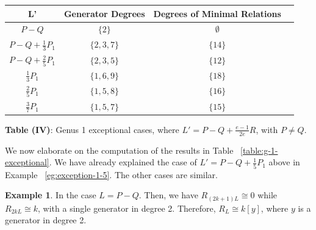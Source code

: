 \documentclass{amsart}
\theoremstyle{plain}
\theoremstyle{definition}
\newtheorem{example}[thm]{Example}
\theoremstyle{remark}
\newtheorem{rem}[thm]{Remark}
\numberwithin{equation}{section}
\begin{document}
\begin{longtable}	{| c || c | c | c |}
	\hline
	L' & Generator Degrees & Degrees of Minimal Relations \\
	\hline
	\hline
	$P - Q$ & $\{2\}$ & $\emptyset$ \\	\hline

	$P - Q + \frac{1}{3}P_1$ & $\{2,3,7\}$ & $\{14\}$ \\	\hline

	$P - Q + \frac{2}{5}P_1$ & $\{2,3,5\}$ & $\{12\}$ \\	\hline
	
	$\frac{1}{3}P_1$ & $\{1,6,9\}$ & $\{18\}$ \\	\hline

	$\frac{2}{5}P_1$ & $\{1,5,8\}$ & $\{16\}$ \\	\hline
	
	$\frac{3}{7}P_1$ & $\{1,5,7\}$ & $\{15\}$ \\	\hline
	
	
\end{longtable}

\begin{center}
\label{table:g-1-exceptional}
\textbf{Table (IV)}: Genus 1 exceptional cases, where $L' = P - Q + \frac{e- 1}{2e}R$, with $P \neq Q$.
\end{center}

We now elaborate on the computation of the results in 
Table ~\ref{table:g-1-exceptional}. We have already explained the case of 
$L' = P - Q + \frac{1}{5}P_1$ above in Example ~\ref{eg:exception-1-5}. The other cases are similar.

\iffalse
\begin{example}
\label{eg:exceptional-1-0}
In the case $L=P - Q.$ Then, we have $R_{(2k+ 1)L} \cong 0$ while $R_{2kL} \cong k$, with a single generator in degree 2. Therefore, $R_L \cong k[y]$, where $y$ is a generator in degree 2. 
\end{example}
\end{document}
